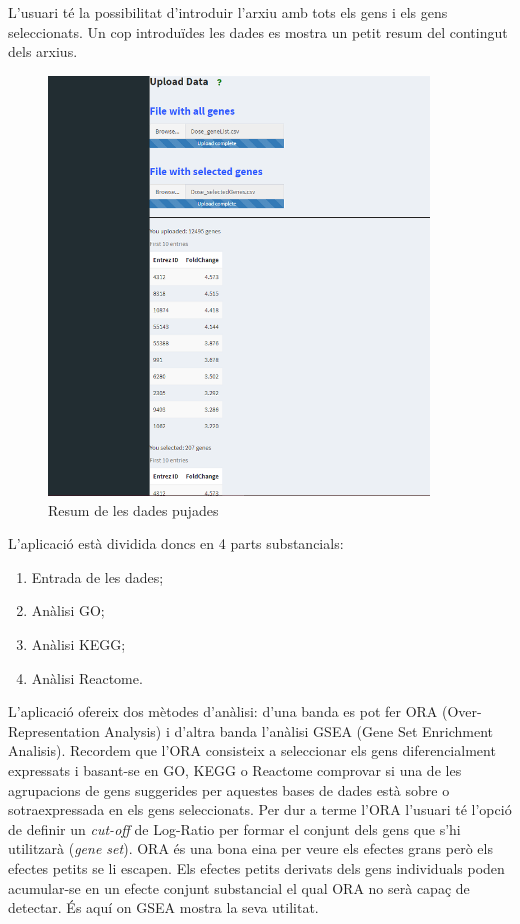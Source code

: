 L'usuari té la possibilitat d'introduir l'arxiu amb tots els gens i els gens seleccionats. Un cop introduïdes les dades es mostra un petit resum del contingut dels arxius.

\begin{figure}[H]
\caption{Resum de les dades pujades}
\centering
\includegraphics[width=0.9\textwidth]{figures/App_F1b.png}
\end{figure}


L'aplicació està dividida doncs en 4 parts substancials:

\begin{enumerate}
\item Entrada de les dades;
\item Anàlisi GO;
\item Anàlisi KEGG;
\item Anàlisi Reactome.
\end{enumerate}


L'aplicació ofereix dos mètodes d'anàlisi: d'una banda es pot fer ORA (Over-Representation Analysis) i d'altra banda l'anàlisi GSEA (Gene Set Enrichment Analisis). Recordem que l'ORA consisteix a seleccionar els gens diferencialment expressats i basant-se en GO, KEGG o Reactome comprovar si una de les agrupacions de gens suggerides per aquestes bases de dades està sobre o sotraexpressada en els gens seleccionats. Per dur a terme l'ORA l'usuari té l’opció de definir un \textit{cut-off} de Log-Ratio per formar el conjunt dels gens que s'hi utilitzarà (\textit{gene set}). ORA és una bona eina per veure els efectes grans però els efectes petits se li escapen. Els efectes petits derivats dels gens individuals poden acumular-se en un efecte conjunt substancial el qual ORA no serà capaç de detectar. És aquí on GSEA mostra la seva utilitat. 

